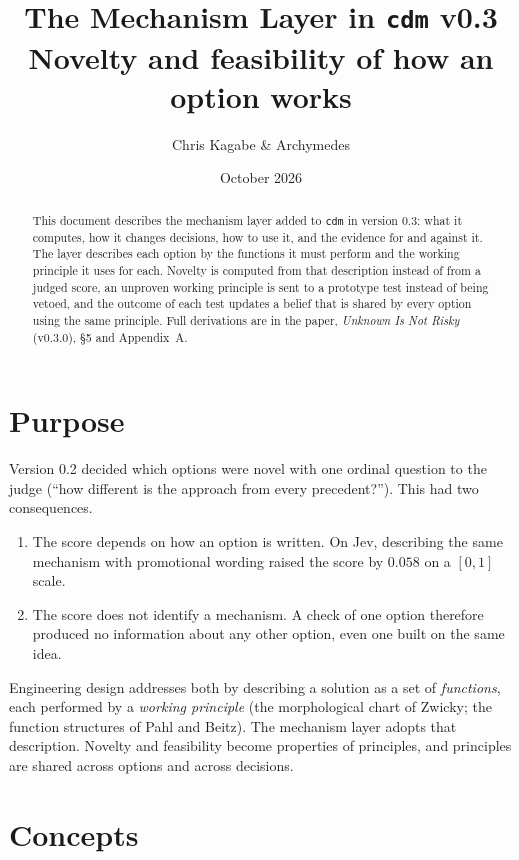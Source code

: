 \documentclass[11pt]{article}
\title{\textbf{The Mechanism Layer in \texttt{cdm} v0.3}\\[4pt]
\large Novelty and feasibility of how an option works}
\author{Chris Kagabe \& Archymedes}
\date{October 2026}
\begin{document}
\maketitle

\begin{abstract}
\noindent This document describes the mechanism layer added to \texttt{cdm} in version 0.3: what
it computes, how it changes decisions, how to use it, and the evidence for and against it. The
layer describes each option by the functions it must perform and the working principle it uses for
each. Novelty is computed from that description instead of from a judged score, an unproven working
principle is sent to a prototype test instead of being vetoed, and the outcome of each test updates
a belief that is shared by every option using the same principle. Full derivations are in the paper,
\emph{Unknown Is Not Risky} (v0.3.0), \S5 and Appendix~A.
\end{abstract}

\section{Purpose}

Version 0.2 decided which options were novel with one ordinal question to the judge (``how
different is the approach from every precedent?''). This had two consequences.
\begin{enumerate}
\item The score depends on how an option is written. On Jev, describing the same mechanism with
promotional wording raised the score by $0.058$ on a $[0,1]$ scale.
\item The score does not identify a mechanism. A check of one option therefore produced no
information about any other option, even one built on the same idea.
\end{enumerate}
Engineering design addresses both by describing a solution as a set of \emph{functions}, each
performed by a \emph{working principle} (the morphological chart of Zwicky; the function structures
of Pahl and Beitz). The mechanism layer adopts that description. Novelty and feasibility become
properties of principles, and principles are shared across options and across decisions.

\section{Concepts}
\end{document}
